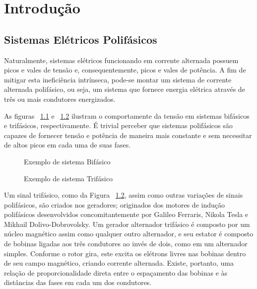 \documentclass[12pt,a4paper,openany]{abntex2}
\begin{document}
	
\imprimircapa	
\imprimirfolhaderosto

\clearpage
\cleardoublepage
\cleardoublepage

\setcounter{page}{3}

\tableofcontents
\clearpage{\pagestyle{empty}\cleardoublepage}

\listoffigures
\clearpage{\pagestyle{empty}\cleardoublepage}
	
\chapter{Introdução}

\section{Sistemas Elétricos Polifásicos}

Naturalmente, sistemas elétricos funcionando em corrente alternada possuem picos e vales de tensão e, consequentemente, picos e vales de potência. A fim de mitigar esta ineficiência intrínseca, pode-se montar um sistema de corrente alternada polifásico, ou seja, um sistema que fornece energia elétrica através de três ou mais condutores energizados.

As figuras ~\ref{fig:sinal-bifasico} e ~\ref{fig:sinal-trifasico} ilustram o comportamente da tensão em sistemas bifásicos e trifásicos, respectivamente. É trivial perceber que sistemas polifásicos são capazes de fornecer tensão e potência de maneira mais constante e sem necessitar de altos picos em cada uma de suas fases.

\begin{figure}[!htp]
	\centering
	\caption{Exemplo de sistema Bifásico}
	\label{fig:sinal-bifasico}
\end{figure}

\begin{figure}[!htp]
	\centering
	\caption{Exemplo de sistema Trifásico}
	\label{fig:sinal-trifasico}
\end{figure}

Um sinal trifásico, como da Figura ~\ref{fig:sinal-trifasico}, assim como outras variações de sinais polifásicos, são criados nos geradores; originados dos motores de indução polifásicos desenvolvidos concomitantemente por Galileo Ferraris, Nikola Tesla e Mikhail Dolivo-Dobrovolsky. Um gerador alternador trifásico é composto por um núcleo magnético assim como qualquer outro alternador, e seu estator é composto de bobinas ligadas aos três condutores ao invés de dois, como em um alternador simples. Conforme o rotor gira, este excita os elétrons livres nas bobinas dentro de seu campo magnético, criando corrente alternada. Existe, portanto, uma relação de proporcionalidade direta entre o espaçamento das bobinas e às distâncias das fases em cada um dos condutores.
\end{document}
